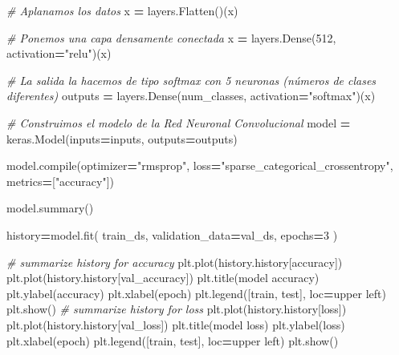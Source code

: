 \documentclass[
  a4paper,
  DIV=11,
  numbers=noendperiod]{scrreprt}
\newenvironment{Shaded}{\begin{snugshade}}{\end{snugshade}}
\newcommand{\BuiltInTok}[1]{#1}
\newcommand{\CommentTok}[1]{\textcolor[rgb]{0.56,0.35,0.01}{\textit{#1}}}
\newcommand{\DecValTok}[1]{\textcolor[rgb]{0.00,0.00,0.81}{#1}}
\newcommand{\NormalTok}[1]{#1}
\newcommand{\OperatorTok}[1]{\textcolor[rgb]{0.81,0.36,0.00}{\textbf{#1}}}
\newcommand{\StringTok}[1]{\textcolor[rgb]{0.31,0.60,0.02}{#1}}
\begin{document}
\begin{Shaded}
\begin{Highlighting}[numbers=left,,]
\CommentTok{\# Aplanamos los datos}
\NormalTok{x }\OperatorTok{=}\NormalTok{ layers.Flatten()(x)}

\CommentTok{\# Ponemos una capa densamente conectada}
\NormalTok{x }\OperatorTok{=}\NormalTok{ layers.Dense(}\DecValTok{512}\NormalTok{, activation}\OperatorTok{=}\StringTok{"relu"}\NormalTok{)(x)}

\CommentTok{\# La salida la hacemos de tipo softmax con 5 neuronas (números de clases diferentes)}
\NormalTok{outputs }\OperatorTok{=}\NormalTok{ layers.Dense(num\_classes, activation}\OperatorTok{=}\StringTok{"softmax"}\NormalTok{)(x)}

\CommentTok{\# Construimos el modelo de la Red Neuronal Convolucional}
\NormalTok{model }\OperatorTok{=}\NormalTok{ keras.Model(inputs}\OperatorTok{=}\NormalTok{inputs, outputs}\OperatorTok{=}\NormalTok{outputs)}

\NormalTok{model.}\BuiltInTok{compile}\NormalTok{(optimizer}\OperatorTok{=}\StringTok{"rmsprop"}\NormalTok{,}
\NormalTok{    loss}\OperatorTok{=}\StringTok{"sparse\_categorical\_crossentropy"}\NormalTok{,}
\NormalTok{    metrics}\OperatorTok{=}\NormalTok{[}\StringTok{"accuracy"}\NormalTok{])}


\NormalTok{model.summary()}


\NormalTok{history}\OperatorTok{=}\NormalTok{model.fit(}
\NormalTok{  train\_ds,}
\NormalTok{  validation\_data}\OperatorTok{=}\NormalTok{val\_ds,}
\NormalTok{  epochs}\OperatorTok{=}\DecValTok{3}
\NormalTok{)}


\CommentTok{\# summarize history for accuracy}
\NormalTok{plt.plot(history.history[}\StringTok{\textquotesingle{}accuracy\textquotesingle{}}\NormalTok{])}
\NormalTok{plt.plot(history.history[}\StringTok{\textquotesingle{}val\_accuracy\textquotesingle{}}\NormalTok{])}
\NormalTok{plt.title(}\StringTok{\textquotesingle{}model accuracy\textquotesingle{}}\NormalTok{)}
\NormalTok{plt.ylabel(}\StringTok{\textquotesingle{}accuracy\textquotesingle{}}\NormalTok{)}
\NormalTok{plt.xlabel(}\StringTok{\textquotesingle{}epoch\textquotesingle{}}\NormalTok{)}
\NormalTok{plt.legend([}\StringTok{\textquotesingle{}train\textquotesingle{}}\NormalTok{, }\StringTok{\textquotesingle{}test\textquotesingle{}}\NormalTok{], loc}\OperatorTok{=}\StringTok{\textquotesingle{}upper left\textquotesingle{}}\NormalTok{)}
\NormalTok{plt.show()}
\CommentTok{\# summarize history for loss}
\NormalTok{plt.plot(history.history[}\StringTok{\textquotesingle{}loss\textquotesingle{}}\NormalTok{])}
\NormalTok{plt.plot(history.history[}\StringTok{\textquotesingle{}val\_loss\textquotesingle{}}\NormalTok{])}
\NormalTok{plt.title(}\StringTok{\textquotesingle{}model loss\textquotesingle{}}\NormalTok{)}
\NormalTok{plt.ylabel(}\StringTok{\textquotesingle{}loss\textquotesingle{}}\NormalTok{)}
\NormalTok{plt.xlabel(}\StringTok{\textquotesingle{}epoch\textquotesingle{}}\NormalTok{)}
\NormalTok{plt.legend([}\StringTok{\textquotesingle{}train\textquotesingle{}}\NormalTok{, }\StringTok{\textquotesingle{}test\textquotesingle{}}\NormalTok{], loc}\OperatorTok{=}\StringTok{\textquotesingle{}upper left\textquotesingle{}}\NormalTok{)}
\NormalTok{plt.show()}



\end{Highlighting}
\end{Shaded}
\end{document}
